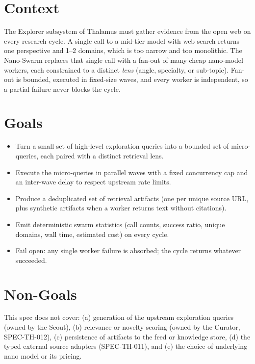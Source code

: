 



\makespecheader

\section{Context}
The Explorer subsystem of Thalamus must gather evidence from the open web on every research cycle.
A single call to a mid-tier model with web search returns one perspective and 1--2 domains, which
is too narrow and too monolithic. The Nano-Swarm replaces that single call with a fan-out of many
cheap nano-model workers, each constrained to a distinct \emph{lens} (angle, specialty, or sub-topic).
Fan-out is bounded, executed in fixed-size waves, and every worker is independent, so a partial
failure never blocks the cycle.

\section{Goals}
\begin{itemize}[leftmargin=1.2em]
  \item Turn a small set of high-level exploration queries into a bounded set of micro-queries, each paired with a distinct retrieval lens.
  \item Execute the micro-queries in parallel waves with a fixed concurrency cap and an inter-wave delay to respect upstream rate limits.
  \item Produce a deduplicated set of retrieval artifacts (one per unique source URL, plus synthetic artifacts when a worker returns text without citations).
  \item Emit deterministic swarm statistics (call counts, success ratio, unique domains, wall time, estimated cost) on every cycle.
  \item Fail open: any single worker failure is absorbed; the cycle returns whatever succeeded.
\end{itemize}

\section{Non-Goals}
\begin{nongoal}
This spec does not cover: (a) generation of the upstream exploration queries (owned by the Scout),
(b) relevance or novelty scoring (owned by the Curator, SPEC-TH-012), (c) persistence of artifacts
to the feed or knowledge store, (d) the typed external source adapters (SPEC-TH-011), and
(e) the choice of underlying nano model or its pricing.
\end{nongoal}

